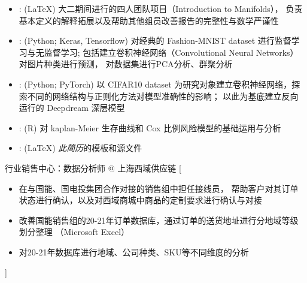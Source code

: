 \documentclass[zh]{resume}
\begin{document}
\begin{itemize}
  \item {}:
    (\LaTeX)
    大二期间进行的四人团队项目（Introduction to Manifolds），
    负责基本定义的解释拓展以及帮助其他组员改善报告的完整性与数学严谨性
  \item {}:
    (Python; Keras, Tensorflow)
    对经典的 Fashion-MNIST dataset 进行监督学习与无监督学习;
    包括建立卷积神经网络（Convolutional Neural Networks）对图片种类进行预测，
    对数据集进行PCA分析、群聚分析
  \item {}:
    (Python; PyTorch)
    以 CIFAR10 dataset 为研究对象建立卷积神经网络，探索不同的网络结构与正则化方法对模型准确性的影响；
    以此为基底建立反向运行的 Deepdream 深层模型
  \item {}:
    (R)
    对 kaplan-Meier 生存曲线和 Cox 比例风险模型的基础运用与分析
  \item {}:
    (\LaTeX)
    \emph{此简历}的模板和源文件
\end{itemize}


\begin{experiences}
    {行业销售中心：数据分析师 @ 上海西域供应链}%
    [\begin{itemize}
      \item 在与国能、国电投集团合作对接的销售组中担任接线员，
        帮助客户对其订单状态进行确认，以及对西域商城中商品的定制要求进行确认与对接
      \item 改善国能销售组的20-21年订单数据库，通过订单的送货地址进行分地域等级划分整理
        （Microsoft Excel）
      \item 对20-21年数据库进行地域、公司种类、SKU等不同维度的分析
    \end{itemize}]

\end{experiences}
\end{document}
